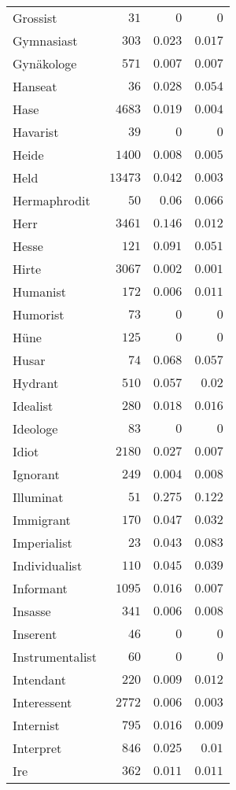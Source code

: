 \begin{supertabular}{lrrr}
Grossist & $31$ & $0$ & $0$ \\
Gymnasiast & $303$ & $0.023$ & $0.017$ \\
Gynäkologe & $571$ & $0.007$ & $0.007$ \\
Hanseat & $36$ & $0.028$ & $0.054$ \\
Hase & $4683$ & $0.019$ & $0.004$ \\
Havarist & $39$ & $0$ & $0$ \\
Heide & $1400$ & $0.008$ & $0.005$ \\
Held & $13473$ & $0.042$ & $0.003$ \\
Hermaphrodit & $50$ & $0.06$ & $0.066$ \\
Herr & $3461$ & $0.146$ & $0.012$ \\
Hesse & $121$ & $0.091$ & $0.051$ \\
Hirte & $3067$ & $0.002$ & $0.001$ \\
Humanist & $172$ & $0.006$ & $0.011$ \\
Humorist & $73$ & $0$ & $0$ \\
Hüne & $125$ & $0$ & $0$ \\
Husar & $74$ & $0.068$ & $0.057$ \\
Hydrant & $510$ & $0.057$ & $0.02$ \\
Idealist & $280$ & $0.018$ & $0.016$ \\
Ideologe & $83$ & $0$ & $0$ \\
Idiot & $2180$ & $0.027$ & $0.007$ \\
Ignorant & $249$ & $0.004$ & $0.008$ \\
Illuminat & $51$ & $0.275$ & $0.122$ \\
Immigrant & $170$ & $0.047$ & $0.032$ \\
Imperialist & $23$ & $0.043$ & $0.083$ \\
Individualist & $110$ & $0.045$ & $0.039$ \\
Informant & $1095$ & $0.016$ & $0.007$ \\
Insasse & $341$ & $0.006$ & $0.008$ \\
Inserent & $46$ & $0$ & $0$ \\
Instrumentalist & $60$ & $0$ & $0$ \\
Intendant & $220$ & $0.009$ & $0.012$ \\
Interessent & $2772$ & $0.006$ & $0.003$ \\
Internist & $795$ & $0.016$ & $0.009$ \\
Interpret & $846$ & $0.025$ & $0.01$ \\
Ire & $362$ & $0.011$ & $0.011$ \\

\end{supertabular}
